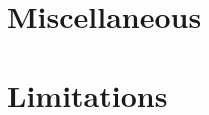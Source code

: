 \section{Miscellaneous}
\label{sec:miscellaneous}






\bigskip

\clearpage



\section{Limitations}
\label{sec:limitations}






\bigskip

\clearpage

